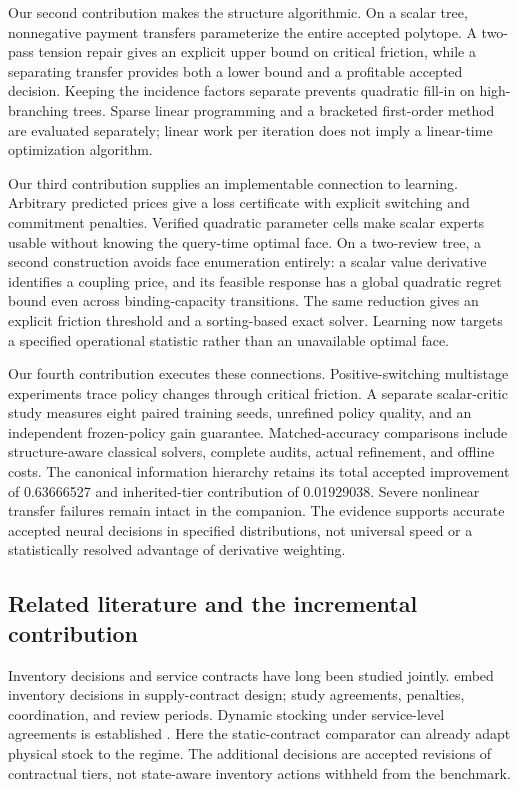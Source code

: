 \documentclass[11pt,letterpaper]{article}
\theoremstyle{definition}
\newcommand{\1}{\mathbf 1}
\begin{document}
Our second contribution makes the structure algorithmic. On a scalar tree, nonnegative payment transfers parameterize the entire accepted polytope. A two-pass tension repair gives an explicit upper bound on critical friction, while a separating transfer provides both a lower bound and a profitable accepted decision. Keeping the incidence factors separate prevents quadratic fill-in on high-branching trees. Sparse linear programming and a bracketed first-order method are evaluated separately; linear work per iteration does not imply a linear-time optimization algorithm.

Our third contribution supplies an implementable connection to learning. Arbitrary predicted prices give a loss certificate with explicit switching and commitment penalties. Verified quadratic parameter cells make scalar experts usable without knowing the query-time optimal face. On a two-review tree, a second construction avoids face enumeration entirely: a scalar value derivative identifies a coupling price, and its feasible response has a global quadratic regret bound even across binding-capacity transitions. The same reduction gives an explicit friction threshold and a sorting-based exact solver. Learning now targets a specified operational statistic rather than an unavailable optimal face.

Our fourth contribution executes these connections. Positive-switching multistage experiments trace policy changes through critical friction. A separate scalar-critic study measures eight paired training seeds, unrefined policy quality, and an independent frozen-policy gain guarantee. Matched-accuracy comparisons include structure-aware classical solvers, complete audits, actual refinement, and offline costs. The canonical information hierarchy retains its total accepted improvement of 0.63666527 and inherited-tier contribution of 0.01929038. Severe nonlinear transfer failures remain intact in the companion. The evidence supports accurate accepted neural decisions in specified distributions, not universal speed or a statistically resolved advantage of derivative weighting.

\subsection{Related literature and the incremental contribution}
Inventory decisions and service contracts have long been studied jointly. \citet{Henig1997} embed inventory decisions in supply-contract design; \citet{LiangAtkins2013,Sieke2012,Katok2008} study agreements, penalties, coordination, and review periods. Dynamic stocking under service-level agreements is established \citep{Hosseinifard2022,Caggiano2007,Abbasi2022}. Here the static-contract comparator can already adapt physical stock to the regime. The additional decisions are accepted revisions of contractual tiers, not state-aware inventory actions withheld from the benchmark.
\end{document}
